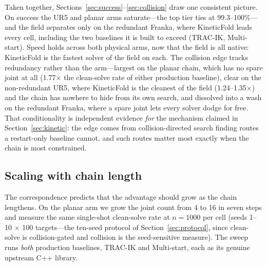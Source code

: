 \documentclass[10pt,conference]{IEEEtran}
\begin{document}
Taken together, Sections~\ref{sec:success}--\ref{sec:collision} draw one
consistent picture. On success the UR5 and planar arms saturate---the top tier
ties at 99.3--100\%---and the field separates only on the redundant Franka, where
KineticFold leads every cell, including the two baselines it is built to exceed
(TRAC-IK, Multi-start). Speed holds across both physical arms, now that the field
is all native: KineticFold is the fastest solver of the field on each. The
collision edge tracks redundancy rather than the arm---largest on the planar
chain, which has no spare joint at all (1.77$\times$ the clean-solve rate of
either production baseline), clear on the non-redundant UR5, where KineticFold is
the cleanest of the field (1.24--1.35$\times$) and the chain has nowhere to hide
from its own search, and dissolved into a wash on the redundant Franka, where a
spare joint lets every solver dodge for free. That conditionality is independent
evidence \emph{for} the mechanism claimed in Section~\ref{sec:kinetic}: the edge
comes from collision-directed search finding routes a restart-only baseline
cannot, and such routes matter most exactly when the chain is most constrained.

\subsection{Scaling with chain length}
\label{sec:scaling}

The correspondence predicts that the advantage should grow as the chain
lengthens. On the planar arm we grow the joint count from 4 to 16 in seven steps
and measure the same single-shot clean-solve rate at $n = 1000$ per cell (seeds
1--10 $\times$ 100 targets---the ten-seed protocol of Section~\ref{sec:protocol},
since clean-solve is collision-gated and collision is the seed-sensitive
measure). The sweep runs \emph{both} production baselines, TRAC-IK and
Multi-start, each as its genuine upstream C++ library.
\end{document}
